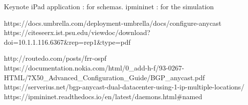 \documentclass[letter, 9pt, conference]{ieeeconf}
\begin{document}






\begin{thebibliography}{99}

 Keynote iPad application : for schemas. 
 ipmininet : for the simulation

 https://docs.umbrella.com/deployment-umbrella/docs/configure-anycast
 https://citeseerx.ist.psu.edu/viewdoc/download?doi=10.1.1.116.6367&rep=rep1&type=pdf

 http://routedo.com/posts/frr-ospf
 https://documentation.nokia.com/html/0\_add-h-f/93-0267-HTML/7X50\_Advanced\_Configuration\_Guide/BGP\_anycast.pdf
 https://serverius.net/bgp-anycast-dual-datacenter-using-1-ip-multiple-locations/
 https://ipmininet.readthedocs.io/en/latest/daemons.html#named


\end{thebibliography}
\end{document}
